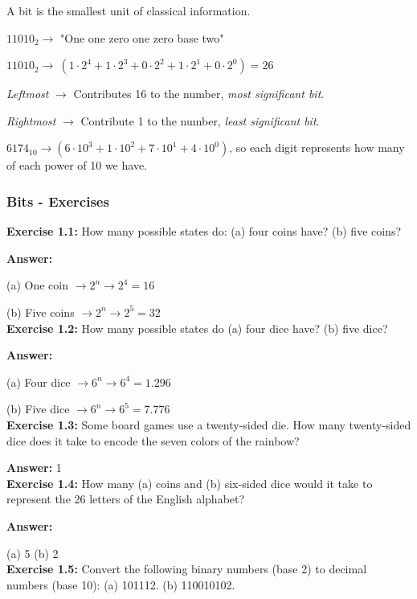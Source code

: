 \documentclass[12pt]{article}
\begin{document}
A bit is the smallest unit of classical information.

\(11010_{2} \rightarrow\) "One one zero one zero base two"

\(11010_{2} \rightarrow\ (1 \cdot 2^{4}+1 \cdot 2^{3}+0 \cdot 2^{2}+1 \cdot 2^{1}+0 \cdot 2^0) = 26\)

\textit{Leftmost} \(\rightarrow\) Contributes 16 to the number, \textit{most significant bit}.

\textit{Rightmost} \(\rightarrow\) Contribute 1 to the number, \textit{least significant bit}.

\(6174_{10} \rightarrow (6 \cdot 10^{3}+1 \cdot 10^{2}+7 \cdot 10^{1}+4 \cdot 10^{0})\), so each digit represents how many of each power of 10 we have.

\subsubsection{Bits - Exercises}

\textbf{Exercise 1.1:} How many possible states do: (a) four coins have? (b) five coins?

\textbf{Answer:}

(a) One coin \(\rightarrow 2^{n} \rightarrow 2^{4} = 16\)

(b) Five coins \(\rightarrow 2^{n} \rightarrow 2^{5} = 32\)\\

\textbf{Exercise 1.2:} How many possible states do (a) four dice have? (b) five dice?

\textbf{Answer:}

(a) Four dice \(\rightarrow 6^{n} \rightarrow 6^{4} = 1.296\)

(b) Five dice \(\rightarrow 6^{n} \rightarrow 6^{5} = 7.776\)\\

\textbf{Exercise 1.3:} Some board games use a twenty-sided die. How many twenty-sided dice does it take to encode the seven colors of the rainbow?

\textbf{Answer:} 1\\

\textbf{Exercise 1.4:} How many (a) coins and (b) six-sided dice would it take to represent the 26 letters of the English alphabet?

\textbf{Answer:}

(a) 5
(b) 2\\

\textbf{Exercise 1.5:} Convert the following binary numbers (base 2) to decimal numbers (base 10): (a) 101112. (b) 110010102.
\end{document}
